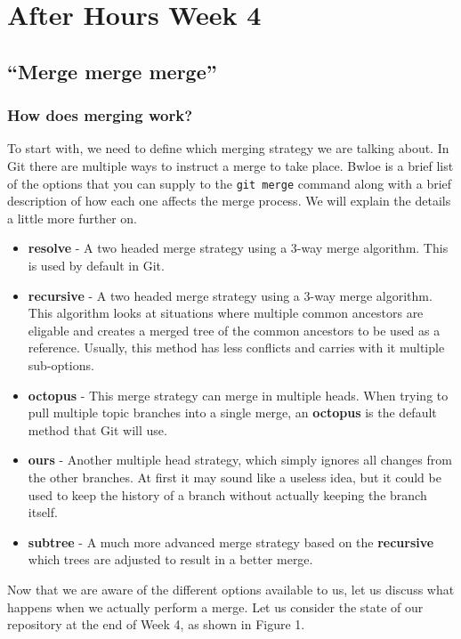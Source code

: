 \chapter{After Hours Week 4}
\section{``Merge merge merge''}
\subsection{How does merging work?}

To start with, we need to define which merging strategy we are talking about.  In Git there are multiple ways to instruct a merge to take place.  Bwloe is a brief list of the options that you can supply to the \texttt{git merge} command along with a brief description of how each one affects the merge process.  We will explain the details a little more further on.

\begin{itemize}
\item\textbf{resolve} - A two headed merge strategy using a 3-way merge algorithm.  This is used by default in Git.
\item\textbf{recursive} - A two headed merge strategy using a 3-way merge algorithm.  This algorithm looks at situations where multiple common ancestors are eligable and creates a merged tree of the common ancestors to be used as a reference.  Usually, this method has less conflicts and carries with it multiple sub-options.
\item\textbf{octopus} - This merge strategy can merge in multiple heads.  When trying to pull multiple topic branches into a single merge, an \textbf{octopus} is the default method that Git will use.
\item\textbf{ours} - Another multiple head strategy, which simply ignores all changes from the other branches.  At first it may sound like a useless idea, but it could be used to keep the history of a branch without actually keeping the branch itself.
\item\textbf{subtree} - A much more advanced merge strategy based on the \textbf{recursive} which trees are adjusted to result in a better merge.
\end{itemize}

Now that we are aware of the different options available to us, let us discuss what happens when we actually perform a merge.  Let us consider the state of our repository at the end of Week 4, as shown in Figure 1.

